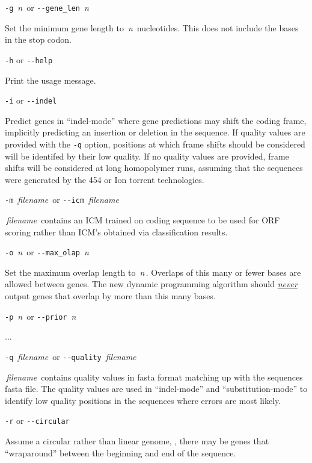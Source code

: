 \documentclass[fleqn,titlepage,11pt]{article}
\def\Desc#1{\,\mbox{\emph{#1}}\,}
\begin{document}
\exdent
  \verb`-g` \Desc{n} \enskip or \enskip \verb`--gene_len` \Desc{n}

  Set the minimum gene length to \Desc{n} nucleotides.  This does not include
  the bases in the stop codon.

\exdent
  \verb`-h` \enskip or \enskip \verb`--help`

  Print the usage message.

\exdent
  \verb`-i` \enskip or \enskip \verb`--indel`

  Predict genes in ``indel-mode'' where gene predictions may shift the
  coding frame, implicitly predicting an insertion or deletion in the
  sequence. If quality values are provided with the \verb`-q` option,
  positions at which frame shifts should be considered will be
  identifed by their low quality. If no quality values are provided,
  frame shifts will be considered at long homopolymer runs, assuming
  that the sequences were generated by the 454 or Ion torrent
  technologies.

\exdent
  \verb`-m` \Desc{filename} \enskip or \enskip \verb`--icm` \Desc{filename}

  \Desc{filename} contains an ICM trained on coding sequence to be used
  for ORF scoring rather than ICM's obtained via classification results.

\exdent
  \verb`-o` \Desc{n} \enskip or \enskip \verb`--max_olap` \Desc{n}

  Set the maximum overlap length to \Desc{n}.  Overlaps of this
  many or fewer bases are allowed between genes.  The new
  dynamic programming algorithm should \underline{\emph{never}}
  output genes that overlap by more than this many bases.

\exdent
  \verb`-p` \Desc{n} \enskip or \enskip \verb`--prior` \Desc{n}

  ...

\exdent
  \verb`-q` \Desc{filename} \enskip or \enskip \verb`--quality` \Desc{filename}

  \Desc{filename} contains quality values in fasta format matching up
  with the sequences fasta file. The quality values are used in
  ``indel-mode'' and ``substitution-mode'' to identify low quality
  positions in the sequences where errors are most likely.

\exdent
  \verb`-r` \enskip or \enskip \verb`--circular`

  Assume a circular rather than linear genome, \ie, there may
  be genes that ``wraparound'' between the beginning and end
  of the sequence.
\end{document}

